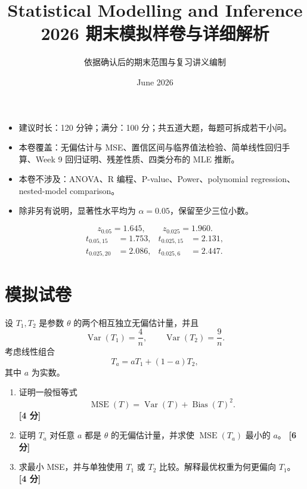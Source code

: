 \documentclass[11pt,a4paper]{article}
\title{\textbf{Statistical Modelling and Inference}\\[0.3em]
2026 期末模拟样卷与详细解析}
\author{依据确认后的期末范围与复习讲义编制}
\date{June 2026}
\newcommand{\Var}{\operatorname{Var}}
\newcommand{\Bias}{\operatorname{Bias}}
\newcommand{\MSE}{\operatorname{MSE}}
\newcommand{\pts}[1]{\hfill\textbf{[#1 分]}}
\begin{document}
\maketitle

\begin{instructionbox}[考试说明]
\begin{itemize}
  \item 建议时长：120 分钟；满分：100 分；共五道大题，每题可拆成若干小问。
  \item 本卷覆盖：无偏估计与 MSE、置信区间与临界值法检验、简单线性回归手算、Week 9 回归证明、残差性质、四类分布的 MLE 推断。
  \item 本卷不涉及：ANOVA、R 编程、P-value、Power、polynomial regression、nested-model comparison。
  \item 除非另有说明，显著性水平均为 $\alpha=0.05$，保留至少三位小数。
\end{itemize}
\end{instructionbox}

\begin{instructionbox}[本卷可直接使用的临界值]
\[
  z_{0.05}=1.645,
  \qquad
  z_{0.025}=1.960.
\]
\[
\begin{aligned}
  t_{0.05,15}&=1.753,
  &t_{0.025,15}&=2.131,\\
  t_{0.025,20}&=2.086,
  &t_{0.025,6}&=2.447.
\end{aligned}
\]
\end{instructionbox}

\tableofcontents
\newpage

\section{模拟试卷}

\begin{questionbox}
设 $T_1,T_2$ 是参数 $\theta$ 的两个相互独立无偏估计量，并且
\[
  \Var(T_1)=\frac4n,
  \qquad
  \Var(T_2)=\frac9n.
\]
考虑线性组合
\[
  T_a=aT_1+(1-a)T_2,
\]
其中 $a$ 为实数。

\begin{enumerate}
  \item 证明一般恒等式
  \[
    \MSE(T)=\Var(T)+\Bias(T)^2.
  \]
  \pts{4}
  \item 证明 $T_a$ 对任意 $a$ 都是 $\theta$ 的无偏估计量，并求使 $\MSE(T_a)$ 最小的 $a$。 \pts{6}
  \item 求最小 MSE，并与单独使用 $T_1$ 或 $T_2$ 比较。解释最优权重为何更偏向 $T_1$。 \pts{4}
\end{enumerate}
\end{questionbox}
\end{document}
